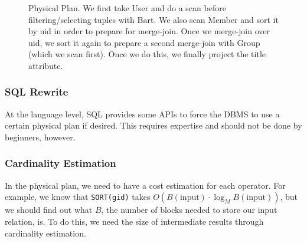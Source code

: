 \begin{example}
      \begin{figure}[H]
        \centering 
        \caption{Physical Plan. We first take User and do a scan before filtering/selecting tuples with Bart. We also scan Member and sort it by uid in order to prepare for merge-join. Once we merge-join over uid, we sort it again to prepare a second merge-join with Group (which we scan first). Once we do this, we finally project the title attribute. } 
        \label{fig:physical_plan}
      \end{figure}
    \end{example} 

  \subsubsection{SQL Rewrite}

    At the language level, SQL provides some APIs to force the DBMS to use a certain physical plan if desired. This requires expertise and should not be done by beginners, however. 

  \subsubsection{Cardinality Estimation}

    In the physical plan, we need to have a cost estimation for each operator. For example, we know that \texttt{SORT(gid)} takes $O(B(\text{input}) \cdot \log_M B(\text{input}))$, but we should find out what $B$, the number of blocks needed to store our input relation, is. To do this, we need the size of intermediate results through cardinality estimation.  

